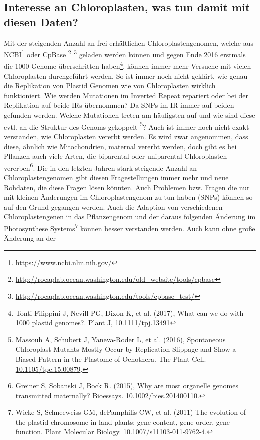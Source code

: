 \documentclass{scrartcl}
\begin{document}
\subsection{Interesse an Chloroplasten, was tun damit mit diesen Daten?}
\label{sec-2-6}
Mit der steigenden Anzahl an frei erhältlichen Chloroplastengenomen, welche aus NCBI\footnote{\url{https://www.ncbi.nlm.nih.gov/}} oder CpBase \footnote{\url{http://rocaplab.ocean.washington.edu/old_website/tools/cpbase}}\textsuperscript{,}\,\footnote{\url{http://rocaplab.ocean.washington.edu/tools/cpbase_test/}} geladen werden können und gegen Ende 2016 erstmals die 1000 Genome überschritten haben\footnote{Tonti-Filippini J, Nevill PG, Dixon K, et al. (2017), What can we do with 1000 plastid genomes?. Plant J, \url{10.1111/tpj.13491}}, können immer mehr Versuche mit vielen Chloroplasten durchgeführt werden.
So ist immer noch nicht geklärt, wie genau die Replikation von Plastid Genomen wie von Chloroplasten wirklich funktioniert. Wie werden Mutationen im Inverted Repeat repariert oder bei der Replikation auf beide IRs übernommen?
Da SNPs im IR immer auf beiden gefunden werden. Welche Mutationen treten am häufigsten auf und wie sind diese evtl. an die Struktur des Genoms gekoppelt \footnote{Massouh A, Schubert J, Yaneva-Roder L, et al. (2016), Spontaneous Chloroplast Mutants Mostly Occur by Replication Slippage and Show a Biased Pattern in the Plastome of Oenothera. The Plant Cell. \url{10.1105/tpc.15.00879}.}? Auch ist immer noch nicht exakt verstanden, wie Chloroplasten
vererbt werden. Es wird zwar angenommen, dass diese, ähnlich wie Mitochondrien, maternal vererbt werden, doch gibt es bei Pflanzen auch viele Arten, die biparental oder uniparental Chloroplasten vererben\footnote{Greiner S, Sobanski J, Bock R. (2015), Why are most organelle genomes transmitted maternally? Bioessays. \url{10.1002/bies.201400110}.}. Die in den letzten 
Jahren stark steigende Anzahl an Chloroplastengenomen gibt diesen Fragestellungen immer mehr und neue Rohdaten, die diese Fragen lösen könnten. Auch Problemen bzw. Fragen die nur mit kleinen Änderungen im Chloroplastengenom zu tun 
haben (SNPs) können so auf den Grund gegangen werden. Auch die Adaption von verschiedenen Chloroplastengenen in das Pflanzengenom und der daraus folgenden Änderung im Photosynthese Systems\footnote{Wicke S, Schneeweiss GM, dePamphilis CW, et al. (2011) The evolution of the plastid chromosome in land plants: gene content, gene order, gene function. Plant Molecular Biology.  \url{10.1007/s11103-011-9762-4}.} können besser verstanden werden. Auch kann ohne große Änderung an der
\end{document}
